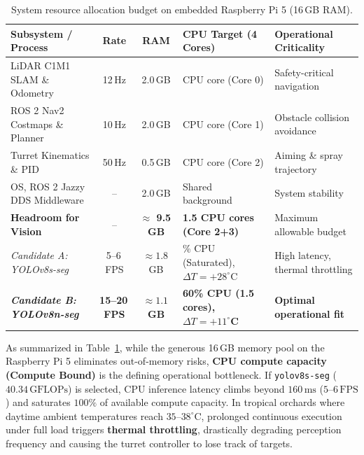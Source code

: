 \documentclass[12pt,a4paper]{article}
\begin{document}
\begin{table}[htbp]
\centering
\footnotesize
\caption{System resource allocation budget on embedded Raspberry Pi 5 (16\,GB RAM).}
\label{tab:edge_budget}
\begin{tabularx}{\textwidth}{>{\raggedright\arraybackslash}p{4.2cm} c c >{\raggedright\arraybackslash}p{3.2cm} X}
\toprule
\textbf{Subsystem / Process} & \textbf{Rate} & \textbf{RAM} & \textbf{CPU Target (4 Cores)} & \textbf{Operational Criticality} \\
\midrule
LiDAR C1M1 SLAM \& Odometry & 12\,Hz & 2.0\,GB & 1 CPU core (Core 0) & Safety-critical navigation \\
ROS 2 Nav2 Costmaps \& Planner & 10\,Hz & 2.0\,GB & 1 CPU core (Core 1) & Obstacle collision avoidance \\
Turret Kinematics \& PID & 50\,Hz & 0.5\,GB & 0.5 CPU core (Core 2) & Aiming \& spray trajectory \\
OS, ROS 2 Jazzy DDS Middleware & -- & 2.0\,GB & Shared background & System stability \\
\midrule
\textbf{Headroom for Vision} & -- & \textbf{$\approx$ 9.5\,GB} & \textbf{1.5 CPU cores (Core 2+3)} & Maximum allowable budget \\
\midrule
\textit{Candidate A: YOLOv8s-seg} & 5--6\,FPS & $\approx 1.8$\,GB & 100\% CPU (Saturated), $\Delta T = +28^\circ$C & High latency, thermal throttling \\
\textit{\textbf{Candidate B: YOLOv8n-seg}} & \textbf{15--20\,FPS} & \textbf{$\approx 1.1$\,GB} & \textbf{60\% CPU (1.5 cores), $\Delta T = +11^\circ$C} & \textbf{Optimal operational fit} \\
\bottomrule
\end{tabularx}
\end{table}

As summarized in Table~\ref{tab:edge_budget}, while the generous 16\,GB memory pool on the Raspberry Pi 5 eliminates out-of-memory risks, \textbf{CPU compute capacity (Compute Bound)} is the defining operational bottleneck. If \texttt{yolov8s-seg} ($40.34\,\text{GFLOPs}$) is selected, CPU inference latency climbs beyond $160\,\text{ms}$ ($5\text{--}6\,\text{FPS}$) and saturates $100\%$ of available compute capacity. In tropical orchards where daytime ambient temperatures reach $35\text{--}38^\circ\text{C}$, prolonged continuous execution under full load triggers \textbf{thermal throttling}, drastically degrading perception frequency and causing the turret controller to lose track of targets.
\end{document}
